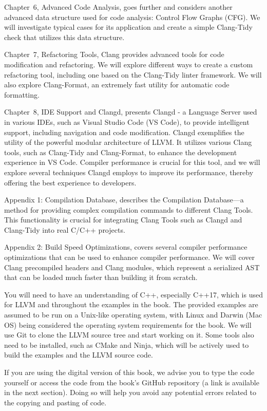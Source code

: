 Chapter 6, Advanced Code Analysis, goes further and considers another advanced data structure used for code analysis: Control Flow Graphs (CFG). We will investigate typical cases for its application and create a simple Clang-Tidy check that utilizes this data structure.

Chapter 7, Refactoring Tools, Clang provides advanced tools for code modification and refactoring. We will explore different ways to create a custom refactoring tool, including one based on the Clang-Tidy linter framework. We will also explore Clang-Format, an extremely fast utility for automatic code formatting.

Chapter 8, IDE Support and Clangd, presents Clangd - a Language Server used in various IDEs, such as Visual Studio Code (VS Code), to provide intelligent support, including navigation and code modification. Clangd exemplifies the utility of the powerful modular architecture of LLVM. It utilizes various Clang tools, such as Clang-Tidy and Clang-Format, to enhance the development experience in VS Code. Compiler performance is crucial for this tool, and we will explore several techniques Clangd employs to improve its performance, thereby offering the best experience to developers.

Appendix 1: Compilation Database, describes the Compilation Database—a method for providing complex compilation commands to different Clang Tools. This functionality is crucial for integrating Clang Tools such as Clangd and Clang-Tidy into real C/C++ projects.

Appendix 2: Build Speed Optimizations, covers several compiler performance optimizations that can be used to enhance compiler performance. We will cover Clang precompiled headers and Clang modules, which represent a serialized AST that can be loaded much faster than building it from scratch.



You will need to have an understanding of C++, especially C++17, which is used for LLVM and throughout the examples in the book. The provided examples are assumed to be run on a Unix-like operating system, with Linux and Darwin (Mac OS) being considered the operating system requirements for the book. We will use Git to clone the LLVM source tree and start working on it. Some tools also need to be installed, such as CMake and Ninja, which will be actively used to build the examples and the LLVM source code.

If you are using the digital version of this book, we advise you to type the code yourself or access the code from the book's GitHub repository (a link is available in the next section). Doing so will help you avoid any potential errors related to the copying and pasting of code.

